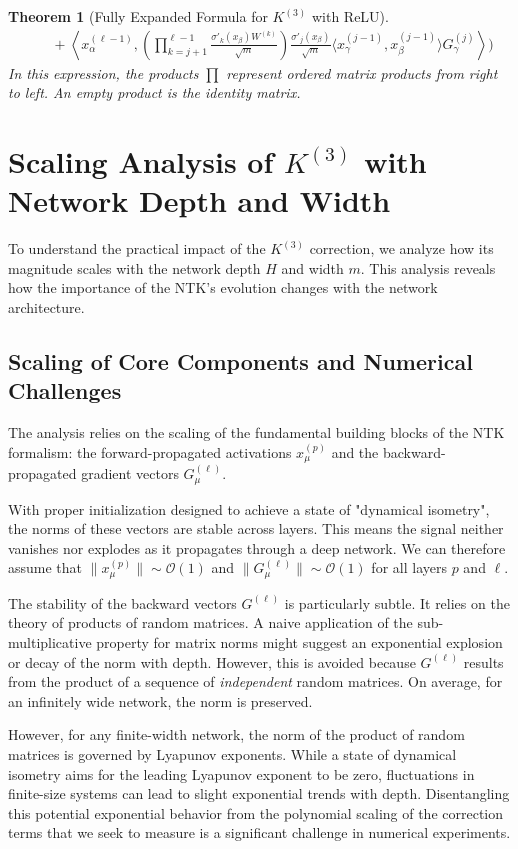 \documentclass{article}
\newtheorem{theorem}{Theorem}[section]
\newcommand{\Order}{\mathcal{O}}
\begin{document}
\begin{theorem}[Fully Expanded Formula for $K^{(3)}$ with ReLU]
\begin{align}
& \quad + \left\langle x^{(\ell-1)}_\alpha, \left( \prod_{k=j+1}^{\ell-1} \frac{\sigma'_{k}(x_\beta) W^{(k)}}{\sqrt{m}} \right) \frac{\sigma'_{j}(x_\beta)}{\sqrt{m}} \langle x^{(j-1)}_\gamma, x^{(j-1)}_\beta \rangle G^{(j)}_\gamma \right\rangle \Biggr)
\end{align}
In this expression, the products $\prod$ represent ordered matrix products from right to left. An empty product is the identity matrix.
\end{theorem}


\section{Scaling Analysis of $K^{(3)}$ with Network Depth and Width}

To understand the practical impact of the $K^{(3)}$ correction, we analyze how its magnitude scales with the network depth $H$ and width $m$. This analysis reveals how the importance of the NTK's evolution changes with the network architecture.

\subsection{Scaling of Core Components and Numerical Challenges}

The analysis relies on the scaling of the fundamental building blocks of the NTK formalism: the forward-propagated activations $x^{(p)}_\mu$ and the backward-propagated gradient vectors $G^{(\ell)}_\mu$.

With proper initialization designed to achieve a state of "dynamical isometry", the norms of these vectors are stable across layers. This means the signal neither vanishes nor explodes as it propagates through a deep network. We can therefore assume that $\|x^{(p)}_\mu\| \sim \Order(1)$ and $\|G^{(\ell)}_\mu\| \sim \Order(1)$ for all layers $p$ and $\ell$.

The stability of the backward vectors $G^{(\ell)}$ is particularly subtle. It relies on the theory of products of random matrices. A naive application of the sub-multiplicative property for matrix norms might suggest an exponential explosion or decay of the norm with depth. However, this is avoided because $G^{(\ell)}$ results from the product of a sequence of \textit{independent} random matrices. On average, for an infinitely wide network, the norm is preserved.

However, for any finite-width network, the norm of the product of random matrices is governed by Lyapunov exponents. While a state of dynamical isometry aims for the leading Lyapunov exponent to be zero, fluctuations in finite-size systems can lead to slight exponential trends with depth. Disentangling this potential exponential behavior from the polynomial scaling of the correction terms that we seek to measure is a significant challenge in numerical experiments.
\end{document}
